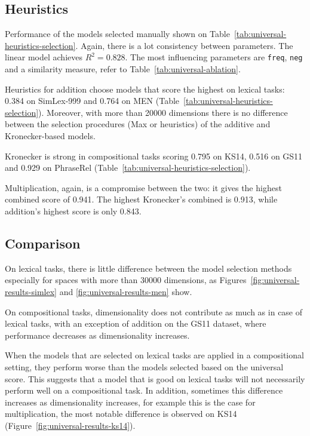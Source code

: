 \subsection{Heuristics}
\label{sec:heuristics-universal}



Performance of the models selected manually shown on Table~\ref{tab:universal-heuristics-selection}. Again, there is a lot consistency between parameters. The linear model achieves $R^2 = 0.828$. The most influencing parameters are \texttt{freq}, \texttt{neg} and a similarity measure, refer to Table~\ref{tab:universal-ablation}.

Heuristics for addition choose models that score the highest on lexical tasks: 0.384 on SimLex-999 and 0.764 on MEN (Table~\ref{tab:universal-heuristics-selection}). Moreover, with more than 20000 dimensions there is no difference between the selection procedures (Max or heuristics) of the additive and Kronecker-based models.

Kronecker is strong in compositional tasks scoring 0.795 on KS14, 0.516 on GS11 and 0.929 on PhraseRel (Table~\ref{tab:universal-heuristics-selection}).

Multiplication, again, is a compromise between the two: it gives the highest combined score of 0.941. The highest Kronecker's combined is 0.913, while addition's highest score is only 0.843.

\subsection{Comparison}
\label{sec:comparison-universal}



On lexical tasks, there is little difference between the model selection methods especially for spaces with more than 30000 dimensions, as Figures~\ref{fig:universal-results-simlex} and \ref{fig:universal-results-men} show.

On compositional tasks, dimensionality does not contribute as much as in case of lexical tasks, with an exception of addition on the GS11 dataset, where performance decreases as dimensionality increases.

When the models that are selected on lexical tasks are applied in a compositional setting, they perform worse than the models selected based on the universal score. This suggests that a model that is good on lexical tasks will not necessarily perform well on a compositional task. In addition, sometimes this difference increases as dimensionality increases, for example this is the case for multiplication, the most notable difference is observed on KS14 (Figure~\ref{fig:universal-results-ks14}).

